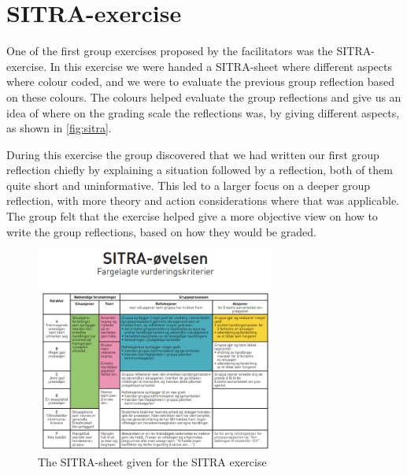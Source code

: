 \section{SITRA-exercise}
One of the first group exercises proposed by the facilitators was the SITRA-exercise. In this exercise we were handed a SITRA-sheet where different aspects where colour coded, and we were to evaluate the previous group reflection based on these colours. The colours helped evaluate the group reflections and give us an idea of where on the grading scale the reflections was, by giving different aspects, as shown in \autoref{fig:sitra}. 

During this exercise the group discovered that we had written our first group reflection chiefly by explaining a situation followed by a reflection, both of them quite short and uninformative. This led to a larger focus on a deeper group reflection, with more theory and action considerations where that was applicable. The group felt that the exercise helped give a more objective view on how to write the group reflections, based on how they would be graded.
\newpage{}
\begin{figure}
	\begin{center}
		\includegraphics[width=0.7\textwidth]{Figures/sitra.png}
	\end{center}
	\caption[The SITRA Exercise]{The SITRA-sheet given for the SITRA exercise}
	\label{fig:sitra}
\end{figure}